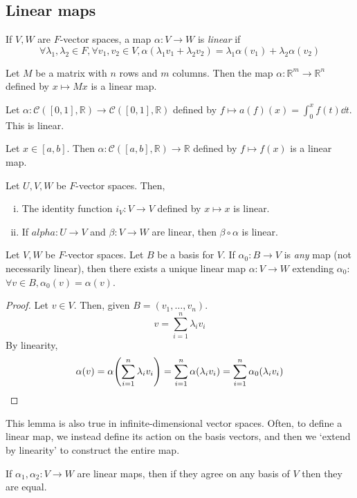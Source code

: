 \subsection{Linear maps}
\begin{definition}
	If \( V, W \) are \( F \)-vector spaces, a map \( \alpha \colon V \to W \) is \textit{linear} if
	\[
		\forall \lambda_1, \lambda_2 \in F, \forall v_1, v_2 \in V, \alpha(\lambda_1 v_1 + \lambda_2 v_2) = \lambda_1 \alpha(v_1) + \lambda_2 \alpha(v_2)
	\]
\end{definition}
\begin{example}
	Let \( M \) be a matrix with \( n \) rows and \( m \) columns.
	Then the map \( \alpha \colon \mathbb R^m \to \mathbb R^n \) defined by \( x \mapsto M x \) is a linear map.
\end{example}
\begin{example}
	Let \( \alpha \colon \mathcal C([0,1], \mathbb R) \to \mathcal C([0,1], \mathbb R) \) defined by \( f \mapsto a(f)(x) = \int_0^x f(t) \dd{t} \).
	This is linear.
\end{example}
\begin{example}
	Let \( x \in [a,b] \).
	Then \( \alpha \colon \mathcal C([a,b], \mathbb R) \to \mathbb R \) defined by \( f \mapsto f(x) \) is a linear map.
\end{example}
\begin{remark}
	Let \( U, V, W \) be \( F \)-vector spaces.
	Then,
	\begin{enumerate}[(i)]
		\item The identity function \( i_V \colon V \to V \) defined by \( x \mapsto x \) is linear.
		\item If \( alpha \colon U \to V \) and \( \beta \colon V \to W \) are linear, then \( \beta \circ \alpha \) is linear.
	\end{enumerate}
\end{remark}
\begin{lemma}
	Let \( V, W \) be \( F \)-vector spaces.
	Let \( B \) be a basis for \( V \).
	If \( \alpha_0 \colon B \to V \) is \textit{any} map (not necessarily linear), then there exists a unique linear map \( \alpha \colon V \to W \) extending \( \alpha_0 \): \( \forall v \in B, \alpha_0(v) = \alpha(v) \).
\end{lemma}
\begin{proof}
	Let \( v \in V \).
	Then, given \( B = (v_1, \dots, v_n) \).
	\[
		v = \sum_{i=1}^n \lambda_i v_i
	\]
	By linearity,
	\[
		\alpha(v) = \alpha\qty(\sum_{i=1}^n \lambda_i v_i) = \sum_{i=1}^n \alpha(\lambda_i v_i) = \sum_{i=1}^n \alpha_0(\lambda_i v_i)
	\]
\end{proof}
\begin{remark}
	This lemma is also true in infinite-dimensional vector spaces.
	Often, to define a linear map, we instead define its action on the basis vectors, and then we `extend by linearity' to construct the entire map.
\end{remark}
\begin{remark}
	If \( \alpha_1, \alpha_2 \colon V \to W \) are linear maps, then if they agree on any basis of \( V \) then they are equal.
\end{remark}

